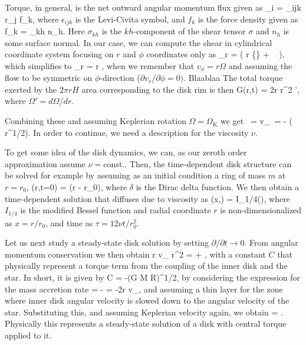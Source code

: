 Torque, in general, is the net outward angular momentum flux given as
\be
\tau_i = \epsilon_{ijk} r_j f_k,
\ee
where $\epsilon_{ijk}$ is the Levi-Civita symbol, and $f_k$ is the force density given as
\be
f_k = \sigma_{kh} n_h.
\ee
Here $\sigma_{kh}$ is the $kh$-component of the shear tensor $\sigma$ and $n_h$ is some surface normal.
In our case, we can compute the shear in cylindrical coordinate system focusing on $r$ and $\phi$ coordinates only as
\be
\sigma_{r\phi} = \rho \nu \left( r  \left\{\right\} +   \right),
\ee
which simplifies to 
\be
\sigma_{r\phi} = \rho \nu r ,
\ee
when we remember that $v_{\phi} = r \Omega$ and assuming the flow to be symmetric on $\phi$-direction ($\partial v_r/\partial \phi = 0)$.
Blaablaa \cite[see, e.g.,][]{ChapmanCowling52}
The total torque exerted by the $2\pi r H$ area corresponding to the disk rim is then
\be
G(r,t) = 2\pi r \nu \Sigma r^2 \Omega',
\ee
where $\Omega' = d\Omega/dr$.

Combining these and assuming Keplerian rotation $\Omega = \Omega_{\mathrm{K}}$ we get
\be
{} =  
\ee
\be
v_{} = -  ( \nu \Sigma r^{1/2}).
\ee
In order to continue, we need a description for the viscosity $\nu$.

To get some idea of the disk dynamics, we can, as our zeroth order approximation assume $\nu = \mathrm{const.}$.
Then, the time-dependent disk structure can be solved for example by assuming as an initial condition a ring of mass $m$ at $r=r_0$,
\be
\Sigma(r,t=0) =  \delta(r - r_0),
\ee
where $\delta$ is the Dirac delta function.
We then obtain a time-dependent solution that diffuses due to viscosity as
\be
\Sigma(x,\tau) =   \exp{} I_{1/4}\left(\right),
\ee
where $I_{1/4}$ is the modified Bessel function and radial coordinate $r$ is non-dimensionalized as $x = r/r_0$, and time as $\tau = 12 \nu t /r_0^2$.

Let us next study a steady-state disk solution by setting $\partial/\partial t \rightarrow 0$.
From angular momentum conservation we then obtain
\be
r \Sigma v_{} r^2 \Omega =  + ,
\ee
with a constant $C$ that physically represent a torque term from the coupling of the inner disk and the star.
In short, it is given by
\be
C = -\Mdot (G M R)^{1/2},
\ee
by considering the expression for the mass accretion rate 
\be
\Mdot = - = -2\pi r \Sigma v_{},
\ee
and assuming a thin layer for the zone where inner disk angular velocity is slowed down to the angular velocity of the star.
Substituting this, and assuming Keplerian velocity again, we obtain
\be
\nu \Sigma = \frac{\Mdot}{3\pi} .
\ee
Physically this represents a steady-state solution of a disk with central torque applied to it.

